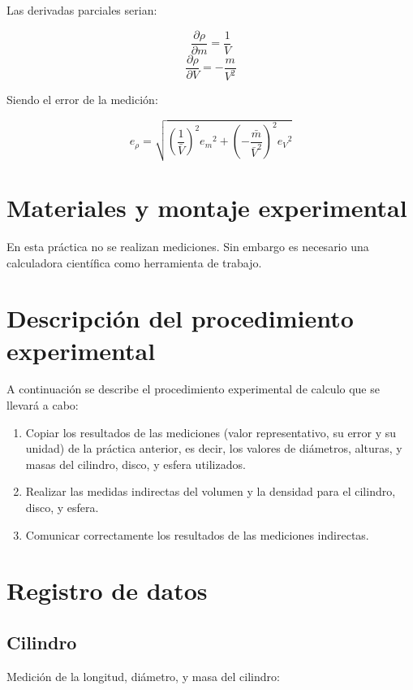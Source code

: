 \documentclass[letter,twoside,11pt]{article}
\begin{document}
Las derivadas parciales serian:

\begin{equation}
    \frac{\partial{\rho}}{\partial{m}} = \frac{1}{V}
\end{equation}
\begin{equation}
    \frac{\partial{\rho}}{\partial{V}} = -\frac{m}{V^2}
\end{equation}

Siendo el error de la medición:

\begin{equation}
    e_{\rho} = \sqrt{
        \left(\frac{1}{\bar{V}}\right)^2 {e_m}^2 +
        \left(-\frac{\bar{m}}{\bar{V}^2}\right)^2 {e_V}^2
    }
\end{equation}

\section{Materiales y montaje experimental}
En esta práctica no se realizan mediciones. Sin embargo es necesario una
calculadora científica como herramienta de trabajo.

\section{Descripción del procedimiento experimental}
A continuación se describe el procedimiento experimental de calculo que se
llevará a cabo:

\begin{enumerate}
\item Copiar los resultados de las mediciones (valor representativo, su error y
su unidad) de la práctica anterior, es decir, los valores de diámetros, alturas,
y masas del cilindro, disco, y esfera utilizados.
\item Realizar las medidas indirectas del volumen y la densidad para el
cilindro, disco, y esfera.
\item Comunicar correctamente los resultados de las mediciones indirectas.
\end{enumerate}

\section{Registro de datos}

\subsection{Cilindro}
Medición de la longitud, diámetro, y masa del cilindro:
\end{document}
